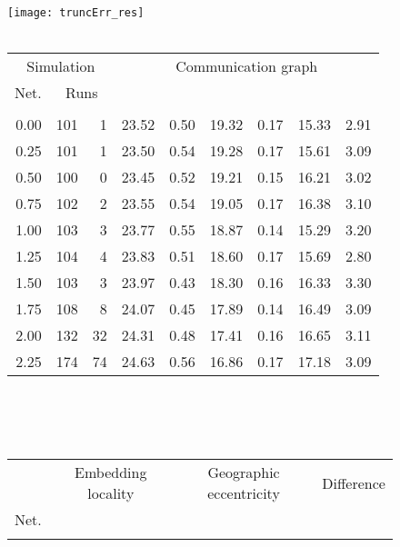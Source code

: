 \documentclass{article}
\begin{document}
\begin{figure}[h]
\begin{center}
\texttt{[image: truncErr\_res]}
~\\~\\
\begin{tabular}{|r|rr|rr|rr|rr|}
\hline
\multicolumn{3}{|c|}{Simulation} & \multicolumn{6}{|c|}{Communication graph}\\
\multicolumn{1}{|c}{Net.} & \multicolumn{2}{c|}{Runs} & \multicolumn{2}{|c}{} & \multicolumn{2}{c}{} & \multicolumn{2}{c|}{}\\
\hline
\multicolumn{1}{|c|}{} & \multicolumn{1}{|c}{} & \multicolumn{1}{c|}{} & \multicolumn{1}{|c}{} & \multicolumn{1}{c|}{} & \multicolumn{1}{|c}{} & \multicolumn{1}{c|}{} & \multicolumn{1}{|c}{} & \multicolumn{1}{c|}{}\\
0.00 & 101 &  1 & 23.52 & 0.50 & 19.32 & 0.17 & 15.33 & 2.91\\
0.25 & 101 &  1 & 23.50 & 0.54 & 19.28 & 0.17 & 15.61 & 3.09\\
0.50 & 100 &  0 & 23.45 & 0.52 & 19.21 & 0.15 & 16.21 & 3.02\\
0.75 & 102 &  2 & 23.55 & 0.54 & 19.05 & 0.17 & 16.38 & 3.10\\
1.00 & 103 &  3 & 23.77 & 0.55 & 18.87 & 0.14 & 15.29 & 3.20\\
1.25 & 104 &  4 & 23.83 & 0.51 & 18.60 & 0.17 & 15.69 & 2.80\\
1.50 & 103 &  3 & 23.97 & 0.43 & 18.30 & 0.16 & 16.33 & 3.30\\
1.75 & 108 &  8 & 24.07 & 0.45 & 17.89 & 0.14 & 16.49 & 3.09\\
2.00 & 132 & 32 & 24.31 & 0.48 & 17.41 & 0.16 & 16.65 & 3.11\\
2.25 & 174 & 74 & 24.63 & 0.56 & 16.86 & 0.17 & 17.18 & 3.09\\
\hline
\end{tabular}\\
~\\~\\
\begin{tabular}{|r|rr|rr|rr|rr|rr|}
\hline
& \multicolumn{4}{|c|}{Embedding locality} & \multicolumn{4}{|c|}{Geographic eccentricity} & \multicolumn{2}{|c|}{Difference}\\
Net. & \multicolumn{2}{c}{} & \multicolumn{2}{c|}{} & \multicolumn{2}{c}{} & \multicolumn{2}{c|}{}&  & \\
\hline
\multicolumn{1}{|c|}{} & \multicolumn{1}{|c}{} & \multicolumn{1}{c|}{} & \multicolumn{1}{|c}{} & \multicolumn{1}{c|}{} & \multicolumn{1}{|c}{} & \multicolumn{1}{c|}{} & \multicolumn{1}{|c}{} & \multicolumn{1}{c|}{} & \multicolumn{1}{|c}{} & \multicolumn{1}{c|}{}\\

\end{tabular}
\end{center}
\end{figure}
\end{document}
